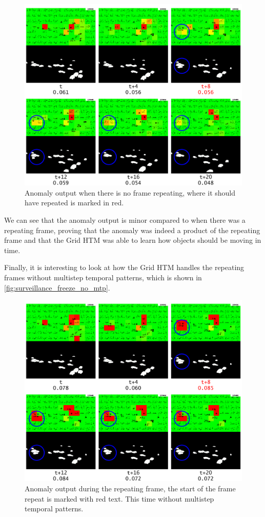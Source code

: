 \begin{figure}[H]
    \centering
    \includegraphics[width=\textwidth]{resources/experiments/surveillance/surveillance_freeze_no_freeze.png}
    \caption{Anomaly output when there is no frame repeating, where it should have repeated is marked in red.}
\end{figure}
We can see that the anomaly output is minor compared to when there was a repeating frame, proving that the anomaly was indeed a product of the repeating frame and that the Grid HTM was able to learn how objects should be moving in time.
\par
Finally, it is interesting to look at how the Grid HTM handles the repeating frames without multistep temporal patterns, which is shown in \autoref{fig:surveillance_freeze_no_mtp}.
\begin{figure}[H]
    \centering
    \includegraphics[width=\textwidth]{resources/experiments/surveillance/surveillance_freeze_no_mtp.png}
    \caption{Anomaly output during the repeating frame, the start of the frame repeat is marked with red text. This time without multistep temporal patterns.}
    \label{fig:surveillance_freeze_no_mtp}
\end{figure}
